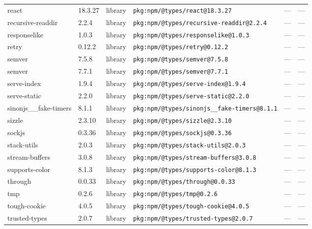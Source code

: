 \documentclass[11pt,a4paper]{article}
\begin{document}
\begin{longtable}{|p{4cm}|p{2cm}|p{1.6cm}|p{5cm}|p{1.5cm}|p{3.5cm}|}
\raggedright react & 18.3.27 & library & \small\texttt{pkg:npm/@types/react@18.3.27} & — & \small — \\
\raggedright recursive-readdir & 2.2.4 & library & \small\texttt{pkg:npm/@types/recursive-readdir@2.2.4} & — & \small — \\
\raggedright responselike & 1.0.3 & library & \small\texttt{pkg:npm/@types/responselike@1.0.3} & — & \small — \\
\raggedright retry & 0.12.2 & library & \small\texttt{pkg:npm/@types/retry@0.12.2} & — & \small — \\
\raggedright semver & 7.5.8 & library & \small\texttt{pkg:npm/@types/semver@7.5.8} & — & \small — \\
\raggedright semver & 7.7.1 & library & \small\texttt{pkg:npm/@types/semver@7.7.1} & — & \small — \\
\raggedright serve-index & 1.9.4 & library & \small\texttt{pkg:npm/@types/serve-index@1.9.4} & — & \small — \\
\raggedright serve-static & 2.2.0 & library & \small\texttt{pkg:npm/@types/serve-static@2.2.0} & — & \small — \\
\raggedright sinonjs\_\_fake-timers & 8.1.1 & library & \small\texttt{pkg:npm/@types/sinonjs\_\_fake-timers@8.1.1} & — & \small — \\
\raggedright sizzle & 2.3.10 & library & \small\texttt{pkg:npm/@types/sizzle@2.3.10} & — & \small — \\
\raggedright sockjs & 0.3.36 & library & \small\texttt{pkg:npm/@types/sockjs@0.3.36} & — & \small — \\
\raggedright stack-utils & 2.0.3 & library & \small\texttt{pkg:npm/@types/stack-utils@2.0.3} & — & \small — \\
\raggedright stream-buffers & 3.0.8 & library & \small\texttt{pkg:npm/@types/stream-buffers@3.0.8} & — & \small — \\
\raggedright supports-color & 8.1.3 & library & \small\texttt{pkg:npm/@types/supports-color@8.1.3} & — & \small — \\
\raggedright through & 0.0.33 & library & \small\texttt{pkg:npm/@types/through@0.0.33} & — & \small — \\
\raggedright tmp & 0.2.6 & library & \small\texttt{pkg:npm/@types/tmp@0.2.6} & — & \small — \\
\raggedright tough-cookie & 4.0.5 & library & \small\texttt{pkg:npm/@types/tough-cookie@4.0.5} & — & \small — \\
\raggedright trusted-types & 2.0.7 & library & \small\texttt{pkg:npm/@types/trusted-types@2.0.7} & — & \small — \\

\end{longtable}
\end{document}
